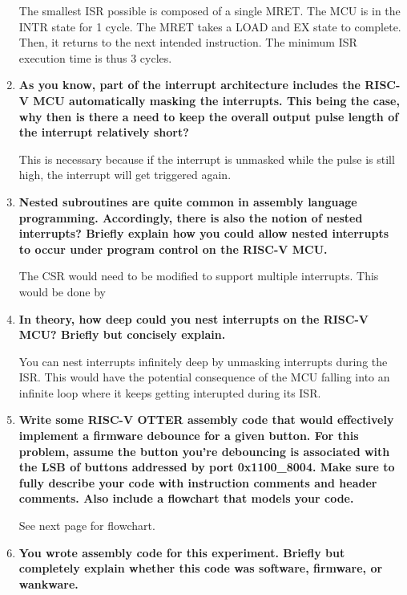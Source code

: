 \documentclass{article}
\begin{document}
\begin{enumerate}
    The smallest ISR possible is composed of a single MRET. The MCU is in the INTR state for 1 cycle. The MRET takes a LOAD and EX state to complete. Then, it returns to the next intended instruction. The minimum ISR execution time is thus 3 cycles.

    \item\textbf{As you know, part of the interrupt architecture includes the RISC-V MCU automatically masking the interrupts. This being the case, why then is there a need to keep the overall output pulse length of the interrupt relatively short?  }
    
    This is necessary because if the interrupt is unmasked while the pulse is still high, the interrupt will get triggered again.

    \item\textbf{Nested subroutines are quite common in assembly language programming. Accordingly, there is also the notion of nested interrupts? Briefly explain how you could allow nested interrupts to occur under program control on the RISC-V MCU.  }

    The CSR would need to be modified to support multiple interrupts. This would be done by 

    \item\textbf{In theory, how deep could you nest interrupts on the RISC-V MCU? Briefly but concisely explain. }
    
    You can nest interrupts infinitely deep by unmasking interrupts during the ISR. This would have the potential consequence of the MCU falling into an infinite loop where it keeps getting interupted during its ISR. 

    \item\textbf{Write some RISC-V OTTER assembly code that would effectively implement a firmware debounce for a given button. For this problem, assume the button you’re debouncing is associated with the LSB of buttons addressed by port 0x1100\_8004. Make sure to fully describe your code with instruction comments and header comments. Also include a flowchart that models your code.  }
    
    

    See next page for flowchart.

    

    \item\textbf{You wrote assembly code for this experiment. Briefly but completely explain whether this code was software, firmware, or wankware.  }


\end{enumerate}
\end{document}
